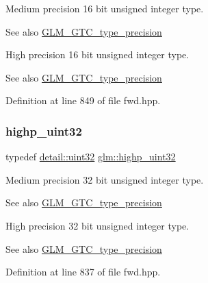 Medium precision 16 bit unsigned integer type. \begin{DoxySeeAlso}{See also}
\hyperlink{group__gtc__type__precision}{G\+L\+M\+\_\+\+G\+T\+C\+\_\+type\+\_\+precision}
\end{DoxySeeAlso}
High precision 16 bit unsigned integer type. \begin{DoxySeeAlso}{See also}
\hyperlink{group__gtc__type__precision}{G\+L\+M\+\_\+\+G\+T\+C\+\_\+type\+\_\+precision} 
\end{DoxySeeAlso}


Definition at line 849 of file fwd.\+hpp.

\mbox{\label{group__gtc__type__precision_ga3145e44c73e2df7dfe4f3cb65974bf22}} 
\subsubsection{\texorpdfstring{highp\+\_\+uint32}{highp\_uint32}}
{\footnotesize\ttfamily typedef \hyperlink{namespaceglm_1_1detail_ade6cfbf377022aaa391af8cd50489222}{detail\+::uint32} \hyperlink{group__gtc__type__precision_ga3145e44c73e2df7dfe4f3cb65974bf22}{glm\+::highp\+\_\+uint32}}

Medium precision 32 bit unsigned integer type. \begin{DoxySeeAlso}{See also}
\hyperlink{group__gtc__type__precision}{G\+L\+M\+\_\+\+G\+T\+C\+\_\+type\+\_\+precision}
\end{DoxySeeAlso}
High precision 32 bit unsigned integer type. \begin{DoxySeeAlso}{See also}
\hyperlink{group__gtc__type__precision}{G\+L\+M\+\_\+\+G\+T\+C\+\_\+type\+\_\+precision} 
\end{DoxySeeAlso}


Definition at line 837 of file fwd.\+hpp.

\mbox{\label{group__gtc__type__precision_ga8eb85ad460079c63b68866ae34637bda}} 
